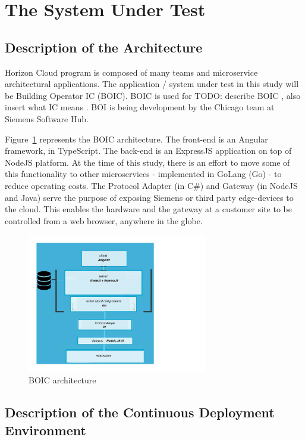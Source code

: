 \documentclass[conference]{IEEEtran}
\newcommand{\todo}[1]{}
\renewcommand{\todo}[1]{{\color{red} TODO: {#1}}}
\begin{document}
\section{The System Under Test}

	\subsection{Description of the Architecture}
	
	Horizon Cloud program is composed of many teams and microservice architectural applications.
	The application / system under test in this study will be Building Operator IC (BOIC).
	BOIC is used for \todo {describe BOIC , also insert what IC means} . BOI is being development by the Chicago team at Siemens Software Hub. 

	Figure~\ref{fig:BOIC architecture} represents the BOIC architecture.
	The front-end is an Angular framework, in TypeScript.
	The back-end is an ExpressJS application on top of NodeJS platform. 
	At the time of this study, there is an effort to move some of this functionality to other microservices - implemented in GoLang (Go) - to reduce operating costs.
	The Protocol Adapter (in C\#) and Gateway (in NodeJS and Java) serve the purpose of exposing Siemens or third party edge-devices to the cloud. 
	This enables the hardware and the gateway at a customer site to be controlled from a web browser, anywhere in the globe.

\begin{figure}[!h]
		\includegraphics[width=0.70\textwidth,]{architecture.pdf}
	\caption{BOIC architecture}
	\label{fig:BOIC architecture}
\end{figure}

	\subsection{Description of the Continuous Deployment Environment }
	
\end{document}
